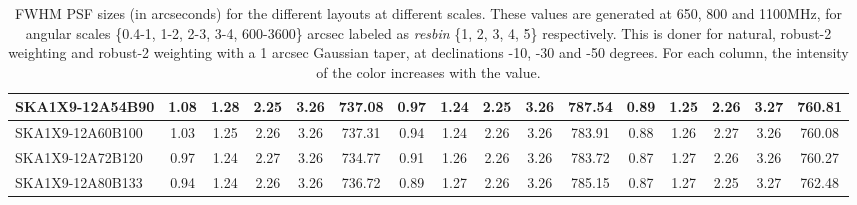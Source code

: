 \begin{table}[H]
{{\begin{tabular}{|lccccc||ccccc||ccccc|}
SKA1X9-12A54B90 & 1.08 \cellcolor{blue!60.00} & 1.28 \cellcolor{red!41.46} & 2.25 \cellcolor{green!18.00} & 3.26 \cellcolor{orange!42.50} & 737.08 \cellcolor{purple!29.35} & 0.97 \cellcolor{blue!57.52} & 1.24 \cellcolor{red!19.88} & 2.25 \cellcolor{green!18.00} & 3.26 \cellcolor{orange!60.00} & 787.54 \cellcolor{purple!49.22} & 0.89 \cellcolor{blue!32.14} & 1.25 \cellcolor{red!18.00} & 2.26 \cellcolor{green!25.81} & 3.27 \cellcolor{orange!51.68} & 760.81 \cellcolor{purple!30.77}\\ \hline 
SKA1X9-12A60B100 & 1.03 \cellcolor{blue!44.35} & 1.25 \cellcolor{red!24.43} & 2.26 \cellcolor{green!49.50} & 3.26 \cellcolor{orange!18.00} & 737.31 \cellcolor{purple!30.50} & 0.94 \cellcolor{blue!43.75} & 1.24 \cellcolor{red!18.00} & 2.26 \cellcolor{green!43.09} & 3.26 \cellcolor{orange!42.07} & 783.91 \cellcolor{purple!19.57} & 0.88 \cellcolor{blue!24.49} & 1.26 \cellcolor{red!32.93} & 2.27 \cellcolor{green!60.00} & 3.26 \cellcolor{orange!31.47} & 760.08 \cellcolor{purple!18.00}\\ \hline 
SKA1X9-12A72B120 & 0.97 \cellcolor{blue!25.81} & 1.24 \cellcolor{red!18.00} & 2.27 \cellcolor{green!60.00} & 3.26 \cellcolor{orange!26.75} & 734.77 \cellcolor{purple!18.00} & 0.91 \cellcolor{blue!25.86} & 1.26 \cellcolor{red!38.22} & 2.26 \cellcolor{green!33.27} & 3.26 \cellcolor{orange!33.10} & 783.72 \cellcolor{purple!18.00} & 0.87 \cellcolor{blue!18.00} & 1.27 \cellcolor{red!52.24} & 2.26 \cellcolor{green!57.77} & 3.26 \cellcolor{orange!18.00} & 760.27 \cellcolor{purple!21.38}\\ \hline 
SKA1X9-12A80B133 & 0.94 \cellcolor{blue!18.00} & 1.24 \cellcolor{red!22.87} & 2.26 \cellcolor{green!36.84} & 3.26 \cellcolor{orange!48.33} & 736.72 \cellcolor{purple!27.60} & 0.89 \cellcolor{blue!18.00} & 1.27 \cellcolor{red!45.59} & 2.26 \cellcolor{green!59.45} & 3.26 \cellcolor{orange!43.96} & 785.15 \cellcolor{purple!29.65} & 0.87 \cellcolor{blue!19.33} & 1.27 \cellcolor{red!46.46} & 2.25 \cellcolor{green!18.00} & 3.27 \cellcolor{orange!60.00} & 762.48 \cellcolor{purple!60.00}\\ \hline 
\end{tabular}}
\vspace{-0.300000cm}
\hspace{1cm} 

\vspace{.25cm}
\caption{FWHM PSF sizes (in arcseconds) for the different layouts at different scales. These values are generated at 650, 800 and 1100MHz, for angular scales \{0.4-1, 1-2, 2-3, 3-4, 600-3600\} arcsec labeled as {\it resbin} \{1, 2, 3, 4, 5\} respectively. This is doner for natural, robust-2 weighting and robust-2 weighting with a 1 arcsec Gaussian taper, at declinations -10, -30 and -50 degrees. For each column, the intensity of the color increases with the value.}\label{tab:psf_mean}}
 \end{table}
